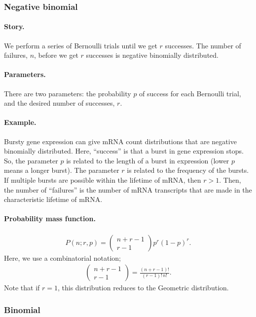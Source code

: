 \subsubsection{Negative binomial}
\paragraph{Story.} We perform a series of Bernoulli trials until we
get $r$ successes.  The number of failures, $n$, before we get $r$
successes is negative binomially distributed.
\paragraph{Parameters.} There are two parameters: the probability $p$
of success for each Bernoulli trial, and the desired number of
successes, $r$.
\paragraph{Example.} Bursty gene expression can give mRNA count
distributions that are negative binomially distributed.  Here,
``success'' is that a burst in gene expression stops.  So, the
parameter $p$ is related to the length of a burst in expression (lower
$p$ means a longer burst).  The parameter $r$ is related to the
frequency of the bursts.  If multiple bursts are possible within the
lifetime of mRNA, then $r > 1$.  Then, the number of ``failures'' is
the number of mRNA transcripts that are made in the characteristic
lifetime of mRNA.
\paragraph{Probability mass function.}
\begin{align}
P(n;r,p) = \begin{pmatrix}
n+r-1 \\
r-1
\end{pmatrix}
p^r (1-p)^r.
\end{align}
Here, we use a combinatorial notation;
\begin{align}
  \begin{pmatrix}
n+r-1 \\
r-1
\end{pmatrix} = \frac{(n+r-1)!}{(r-1)!\,n!}.
\end{align}
Note that if $r = 1$, this distribution reduces to the Geometric
distribution.



\subsubsection{Binomial}
